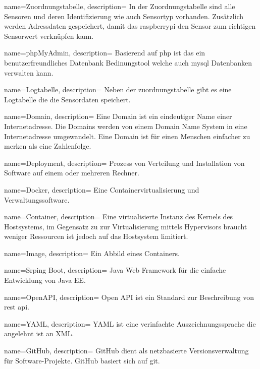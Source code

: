 {
	name=Zuordnungstabelle,
	description={
		In der Zuordnungstabelle sind alle Sensoren und deren Identifizierung wie auch Sensortyp vorhanden. Zusätzlich werden Adressdaten gespeichert, damit das \gls{raspberrypi} den Sensor zum richtigen Sensorwert verknüpfen kann.
	}
}

{
	name=phpMyAdmin,
	description={
		Basierend auf \gls{php} ist das ein benutzerfreundliches Datenbank Bedinungstool welche auch \gls{mysql} Datenbanken verwalten kann.
	}
}

{
	name=Logtabelle,
	description={
		Neben der \gls{zuordnungstabelle} gibt es eine Logtabelle die die Sensordaten speichert.
	}
}

{
	name=Domain,
	description={
		Eine Domain ist ein eindeutiger Name einer Internetadresse. Die Domains werden von einem Domain Name System in eine Internetadresse umgewandelt. Eine Domain ist für einen Menschen einfacher zu merken als eine Zahlenfolge.
	}
}

{
	name=Deployment,
	description={
		Prozess von Verteilung und Installation von Software auf einem oder mehreren Rechner.
	}
}

{
	name=Docker,
	description={
		Eine Containervirtualisierung und Verwaltungssoftware.
	}
}

{
	name=Container,
	description={
		Eine virtualisierte Instanz des Kernels des Hostsystems, im Gegensatz zu zur Virtualisierung mittels Hypervisors braucht weniger Ressourcen ist jedoch auf das Hostsystem limitiert.
	}
}

{
	name=Image,
	description={
		Ein Abbild eines Containers.
	}
}

{
	name=Srping Boot,
	description={
		Java Web Framework für die einfache Entwicklung von Java EE.
	}
}

{
	name=OpenAPI,
	description={
		Open API ist ein Standard zur Beschreibung von \gls{rest} \gls{api}.
	}
}

{
	name=YAML,
	description={
		YAML ist eine verinfachte Auszeichnungssprache die angelehnt ist an XML.
	}
}

{
	name=GitHub,
	description={
		GitHub dient als netzbasierte Versionsverwaltung für Software-Projekte. GitHub basiert sich auf \gls{git}.
	}
}

